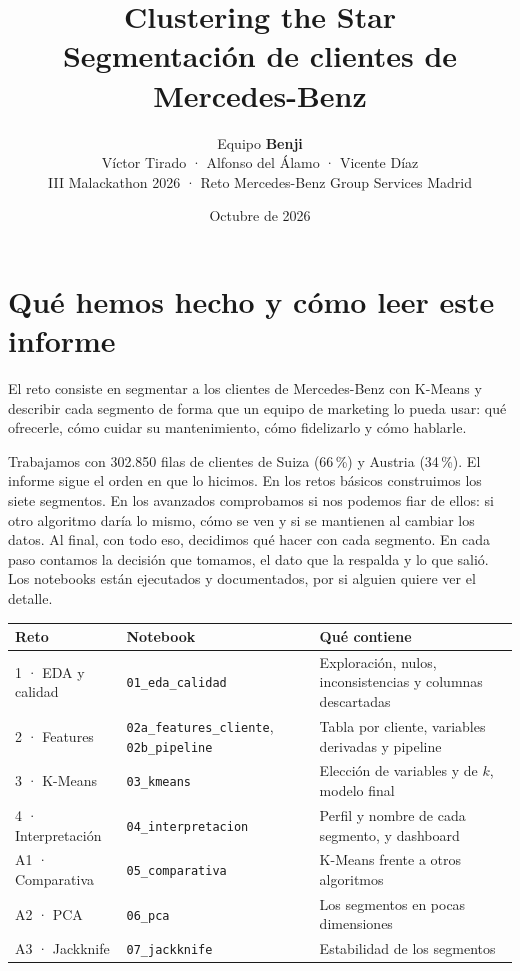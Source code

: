 \documentclass[11pt,a4paper]{article}
\title{\textbf{Clustering the Star}\\[4pt]
\large Segmentación de clientes de Mercedes-Benz}
\author{Equipo \textbf{Benji}\\[2pt]
Víctor Tirado · Alfonso del Álamo · Vicente Díaz\\[6pt]
\small III Malackathon 2026 · Reto Mercedes-Benz Group Services Madrid}
\date{Octubre de 2026}
\newcommand{\var}[1]{\texttt{\small #1}}
\begin{document}
\maketitle

\section{Qué hemos hecho y cómo leer este informe}

El reto consiste en segmentar a los clientes de Mercedes-Benz con K-Means y describir cada segmento de forma que un equipo de marketing lo pueda usar: qué ofrecerle, cómo cuidar su mantenimiento, cómo fidelizarlo y cómo hablarle.

Trabajamos con 302.850 filas de clientes de Suiza (66\,\%) y Austria (34\,\%). El informe sigue el orden en que lo hicimos. En los retos básicos construimos los siete segmentos. En los avanzados comprobamos si nos podemos fiar de ellos: si otro algoritmo daría lo mismo, cómo se ven y si se mantienen al cambiar los datos. Al final, con todo eso, decidimos qué hacer con cada segmento. En cada paso contamos la decisión que tomamos, el dato que la respalda y lo que salió. Los notebooks están ejecutados y documentados, por si alguien quiere ver el detalle.

\begin{center}
\small
\begin{tabularx}{\linewidth}{l>{\raggedright\arraybackslash}p{5.2cm}L}
\toprule
Reto & Notebook & Qué contiene \\
 · EDA y calidad & \var{01\_eda\_calidad} & Exploración, nulos, inconsistencias y columnas descartadas \\
2 · Features & \var{02a\_features\_cliente}, \var{02b\_pipeline} & Tabla por cliente, variables derivadas y pipeline \\
3 · K-Means & \var{03\_kmeans} & Elección de variables y de $k$, modelo final \\
4 · Interpretación & \var{04\_interpretacion} & Perfil y nombre de cada segmento, y dashboard \\
A1 · Comparativa & \var{05\_comparativa} & K-Means frente a otros algoritmos \\
A2 · PCA & \var{06\_pca} & Los segmentos en pocas dimensiones \\
A3 · Jackknife & \var{07\_jackknife} & Estabilidad de los segmentos \\
\bottomrule
\end{tabularx}
\end{center}
\end{document}
